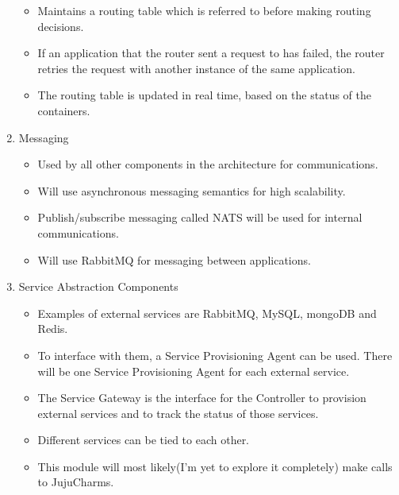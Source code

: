 \documentclass[a4paper]{article}
\begin{document}
\begin{enumerate}
\begin{itemize}
		  \item Maintains a routing table which is referred to before making routing decisions.
		  \item If an application that the router sent a request to has failed, the router retries the request with another instance of the same application. 
		  \item The routing table is updated in real time, based on the status of the containers.
	  \end{itemize}
	  \item Messaging
	  \begin{itemize}
		  \item Used by all other components in the architecture for communications.
		  \item Will use asynchronous messaging semantics for high scalability.
		  \item Publish/subscribe messaging called NATS will be used for internal communications.
		  \item Will use RabbitMQ for messaging between applications.
	  \end{itemize}
	  \item Service Abstraction Components
	  \begin{itemize}
		  \item Examples of external services are RabbitMQ, MySQL, mongoDB and Redis. 
		  \item To interface with them, a Service Provisioning Agent can be used. There will be one Service Provisioning Agent for each external service.  
		  \item The Service Gateway is the interface for the Controller to provision external services and to track the status of those services.
		  \item Different services can be tied to each other.
		  \item This module will most likely(I'm yet to explore it completely) make calls to JujuCharms.
	  \end{itemize}
  \end{enumerate}
  
\end{document}
